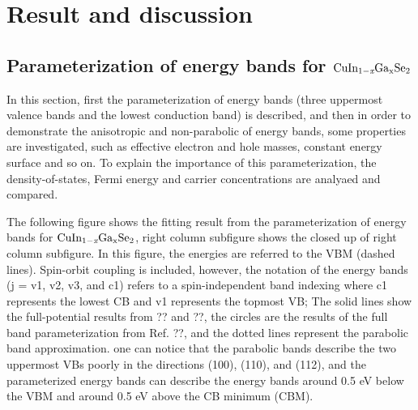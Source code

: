 \documentclass[a4paper, 12pt, titlepage,oneside,drop]{kthesis}
\begin{document}


\chapter{Result and discussion}

\section{Parameterization of energy bands for $\mathrm { CuIn_{1-\textit{x}}Ga_{x}Se_2}$}
In this section, first the parameterization of energy bands (three uppermost valence bands and the lowest conduction band) is described, and then in order to demonstrate
the anisotropic and non-parabolic of energy bands, some properties are investigated, such as effective electron and hole masses, constant energy surface and so on.
To explain the importance of this parameterization, the density-of-states, Fermi energy and carrier concentrations are analyaed and compared.

The following figure shows the fitting result from the parameterization of energy bands for $\mathrm { CuIn_{1-\textit{x}}Ga_{x}Se_2}$, right column subfigure shows the closed up of right column subfigure.
In this figure, the energies are referred to the VBM (dashed lines). Spin-orbit coupling is included, however, the notation of the energy bands (j = v1, v2, v3, and c1) 
refers to a spin-independent band indexing where c1 represents the lowest CB and v1 represents the topmost VB; The solid lines show the full-potential
 results from ?? and ??, the circles are the results of the full band parameterization from Ref. ??, and the dotted lines represent the parabolic band approximation.
one can notice that the parabolic bands describe the two uppermost VBs poorly in the directions (100), (110), and (112), and the parameterized energy bands can describe the energy bands around 0.5 eV
below the VBM and around 0.5 eV above the CB minimum (CBM). 
\end{document}
